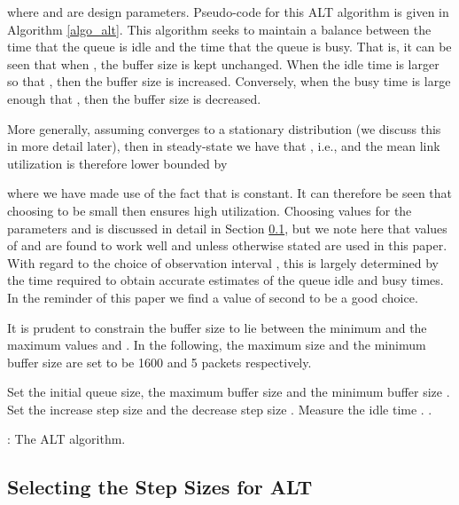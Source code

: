 \documentclass[10pt,twocolumn, journal]{IEEEtran}
\begin{document}
where  and  are design parameters. Pseudo-code for
this ALT algorithm is given in Algorithm \ref{algo_alt}.   This algorithm seeks to maintain a balance between the time  that the queue is idle and the time  that the queue is busy.  That is, it can be seen that when , the buffer size is kept unchanged.  When the idle time is larger so that , then the buffer size is increased.  Conversely, when the busy time is large enough that , then the buffer size is decreased.

More generally, assuming  converges to a stationary distribution (we discuss this in more detail
later), then in steady-state we have that , i.e.,  and the mean link utilization is therefore lower bounded by

where we have made use of the fact that   is constant.  It can therefore be seen that choosing  to be small then ensures high utilization.   Choosing values for the parameters  and  is discussed in detail in Section \ref{sec:analysis},  but we note here that values of  and  are found to work well and unless otherwise stated are used in this paper.   With regard to the choice of observation interval , this is largely determined by the time required to obtain accurate estimates of the queue idle and busy times.  In the reminder of this paper we find a value of  second to be a good choice.

It is prudent to constrain the buffer size  to lie between the minimum and the maximum values  and .  In the following, the maximum size  and the minimum buffer size  are set to be 1600 and 5 packets respectively.   


\begin{algorithm}[tb]
    \begin{algorithmic}[1]
        \STATE Set the initial queue size, the maximum buffer size  and
            the minimum buffer size .
        \STATE Set the increase step size  and the decrease step size .
            \STATE Measure the idle time .
            \STATE .
            \STATE  
       \ENDFOR
    \end{algorithmic}
    \caption{: The ALT algorithm.}
    \label{algo_alt}
\end{algorithm}



\subsection{Selecting the Step Sizes for ALT}\label{sec:analysis}
\end{document}
